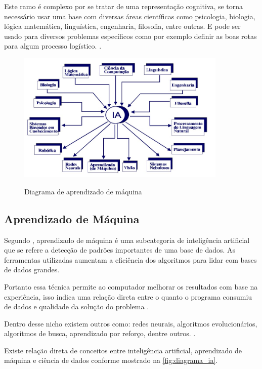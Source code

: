 \documentclass[
	12pt,				%
	openright,			%
	twoside,			%
	a4paper,			%
	english,			%
	french,				%
	spanish,			%
	brazil				%
	]{abntex2}
\begin{document}
Este ramo é complexo por se tratar de uma representação cognitiva, se torna necessário usar uma base com diversas áreas científicas como psicologia, biologia, lógica matemática, linguística, engenharia, filosofia, entre outras. E pode ser usado para diversos problemas específicos como por exemplo definir as boas rotas para algum processo logístico. \space\cite{ia_conceitos_aplicacoes}.

\begin{figure}[H]
	\caption{Diagrama de aprendizado de máquina}
	\centering %
	\includegraphics[width=10cm]{figures/areas_ia.jpg} %
	\label{fig:areas_ia}
\end{figure}
\subsection{Aprendizado de Máquina}

Segundo , aprendizado de máquina é uma subcategoria de inteligência artificial que se refere  a detecção de padrões importantes de uma base de dados. As ferramentas utilizadas aumentam a eficiência dos algoritmos para lidar com bases de dados grandes.

Portanto essa técnica permite ao computador melhorar os resultados com base na experiência, isso indica uma relação direta entre o quanto o programa consumiu de dados e qualidade da solução do problema \cite{ml_explicado}. 

Dentro desse nicho existem outros como: redes neurais, algoritmos evolucionários, algoritmos de busca, aprendizado por reforço, dentre outros. \cite{ml_oil_gas_industry}.

Existe relação direta de conceitos entre inteligência artificial, aprendizado de máquina e ciência de dados conforme mostrado na \cref{fig:diagrama_ia}.
\end{document}
